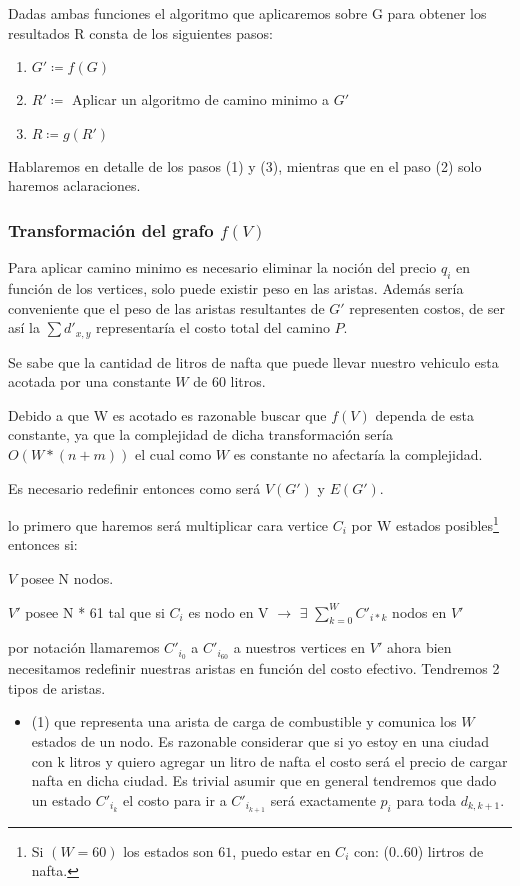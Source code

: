 \documentclass[12pt]{article}
\def\is{\coloneqq}
\begin{document}
Dadas ambas funciones el algoritmo que aplicaremos sobre G para obtener los resultados R consta de los siguientes pasos:

\begin{enumerate}
	\item $G' \is f(G)$
	\item $R' \is$ Aplicar un algoritmo de camino minimo a $G'$
	\item $R \is g(R')$
\end{enumerate}

Hablaremos en detalle de los pasos (1) y (3), mientras que en el paso (2) solo haremos aclaraciones.

\subsubsection{Transformación del grafo $f(V)$}

Para aplicar camino minimo es necesario eliminar la noción del precio $q_i$ en función de los vertices, solo puede existir peso en las aristas. Además sería conveniente que el peso de las aristas resultantes de $G'$ representen costos, de ser así la $\sum d'_{x,y}$ representaría el costo total del camino $P$.  

Se sabe que la cantidad de litros de nafta que puede llevar nuestro vehiculo esta acotada por una constante $W$ de 60 litros. 

Debido a que W es acotado es razonable buscar que $f(V)$ dependa de esta constante, ya que la complejidad de dicha transformación sería $O(W * (n + m))$ el cual como $W$ es constante no afectaría la complejidad.

Es necesario redefinir entonces como será $V(G')$ y $E(G')$.

lo primero que haremos será multiplicar cara vertice $C_i$ por W estados posibles\footnote{Si $(W = 60)$ los estados son $61$, puedo estar en $C_i$ con: (0..60) lirtros de nafta.} entonces si:

$V$ posee  N nodos. 

$V'$ posee N * 61 tal que si $C_i$ es nodo en V $\rightarrow$ $\exists$ $\sum_{k=0}^{W} C'_{i * k}$ nodos en $V'$

por notación llamaremos $C'_{i_0}$ a $C'_{i_{60}}$ a nuestros vertices en $V'$ ahora bien necesitamos redefinir nuestras aristas en función del costo efectivo. Tendremos 2 tipos de aristas.

\begin{itemize}
	\item (1) que representa una arista de carga de combustible y comunica los $W$ estados de un nodo. Es razonable considerar que si yo estoy en una ciudad con k litros y quiero agregar un litro de nafta el costo será el precio de cargar nafta en dicha ciudad. Es trivial asumir que en general tendremos que dado un estado $C'_{i_k}$ el costo para ir a $C'_{i_{k+1}}$ será exactamente $p_i$ para toda $d_{k,k+1}$.
\end{itemize}
\end{document}
